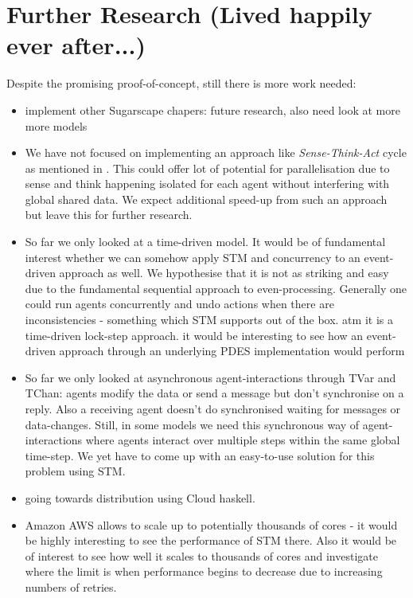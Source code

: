 \section{Further Research (Lived happily ever after...)}
Despite the promising proof-of-concept, still there is more work needed:

\begin{itemize}
	\item implement other Sugarscape chapers: future research, also need look at more more models
	\item We have not focused on implementing an approach like \textit{Sense-Think-Act} cycle as mentioned in \cite{xiao_survey_2018}. This could offer lot of potential for parallelisation due to sense and think happening isolated for each agent without interfering with global shared data. We expect additional speed-up from such an approach but leave this for further research.
	\item So far we only looked at a time-driven model. It would be of fundamental interest whether we can somehow apply STM and concurrency to an event-driven approach as well. We hypothesise that it is not as striking and easy due to the fundamental sequential approach to even-processing. Generally one could run agents concurrently and undo actions when there are inconsistencies - something which STM supports out of the box. atm it is a time-driven lock-step approach. it would be interesting to see how an event-driven approach through an underlying PDES implementation would perform
	\item So far we only looked at asynchronous agent-interactions through TVar and TChan: agents modify the data or send a message but don't synchronise on a reply. Also a receiving agent doesn't do synchronised waiting for messages or data-changes. Still, in some models we need this synchronous way of agent-interactions where agents interact over multiple steps within the same global time-step. We yet have to come up with an easy-to-use solution for this problem using STM.
	\item going towards distribution using Cloud haskell.
	\item Amazon AWS allows to scale up to potentially thousands of cores - it would be highly interesting to see the performance of STM there. Also it would be of interest to see how well it scales to thousands of cores and investigate where the limit is when performance begins to decrease due to increasing numbers of retries.
\end{itemize}
